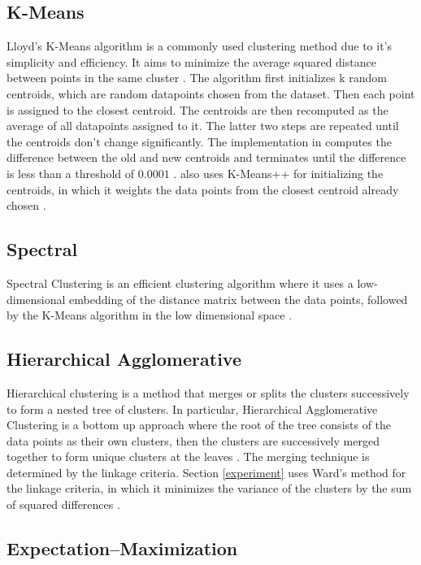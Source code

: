 \documentclass[12pt,english]{article}
\begin{document}
\subsection{K-Means}

\quad
Lloyd’s K-Means algorithm is a commonly used clustering method due to it's simplicity and efficiency. It aims to minimize the average squared distance between points in the same cluster \cite{kmeans}. The algorithm first initializes k random centroids, which are random datapoints chosen from the dataset. Then each point is assigned to the closest centroid. The centroids are then recomputed as the average of all datapoints assigned to it. The latter two steps are repeated until the centroids don't change significantly. The implementation in \cite{scikit-learn} computes the difference between the old and new centroids and terminates until the difference is less than a threshold of $0.0001$ \cite{kmeans}. \cite{scikit-learn} also uses K-Means++ for initializing the centroids, in which it weights the data points from the closest centroid already chosen \cite{kmeans}.

\subsection{Spectral}

\quad
Spectral Clustering is an efficient clustering algorithm where it uses a low-dimensional embedding of the distance matrix between the data points, followed by the K-Means algorithm in the low dimensional space \cite{scikit-learn}.

\subsection{Hierarchical Agglomerative}

\quad
Hierarchical clustering is a method that merges or splits the clusters successively to form a nested tree of clusters. In particular, Hierarchical Agglomerative Clustering is a bottom up approach where the root of the tree consists of the data points as their own clusters, then the clusters are successively merged together to form unique clusters at the leaves \cite{scikit-learn}. The merging technique is determined by the linkage criteria. Section \ref{experiment} uses Ward's method for the linkage criteria, in which it minimizes the variance of the clusters by the sum of squared differences \cite{scikit-learn}.

\subsection{Expectation–Maximization}
\end{document}
